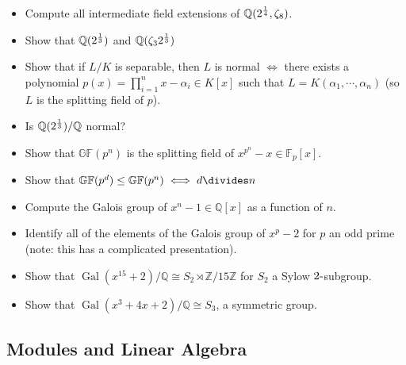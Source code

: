 \begin{itemize}
\tightlist
\item
  Compute all intermediate field extensions of
  \({\mathbb{Q}}(2^{1\over 4}, \zeta_8)\).
\item
  Show that \({\mathbb{Q}}(2^{1\over 3})\) and
  \({\mathbb{Q}}(\zeta_3 2^{1\over 3})\)
\item
  Show that if \(L/K\) is separable, then \(L\) is normal \(\iff\) there
  exists a polynomial \(p(x) = \prod_{i=1}^n x- \alpha_i\in K[x]\) such
  that \(L = K(\alpha_1, \cdots, \alpha_n)\) (so \(L\) is the splitting
  field of \(p\)).
\item
  Is \({\mathbb{Q}}(2^{1\over 3})/{\mathbb{Q}}\) normal?
\item
  Show that \({\mathbb{GF}}(p^n)\) is the splitting field of
  \(x^{p^n} - x \in {\mathbb{F}}_p[x]\).
\item
  Show that
  \({\mathbb{GF}}(p^d) \leq {\mathbb{GF}}(p^n) \iff d\divides n\)
\item
  Compute the Galois group of \(x^n - 1 \in {\mathbb{Q}}[x]\) as a
  function of \(n\).
\item
  Identify all of the elements of the Galois group of \(x^p-2\) for
  \(p\) an odd prime (note: this has a complicated presentation).
\item
  Show that
  \(\operatorname{Gal}(x^{15}+2)/{\mathbb{Q}}\cong S_2 \rtimes{\mathbb{Z}}/15{\mathbb{Z}}\)
  for \(S_2\) a Sylow \(2{\hbox{-}}\)subgroup.
\item
  Show that \(\operatorname{Gal}(x^3+4x+2)/{\mathbb{Q}}\cong S_3\), a
  symmetric group.
\end{itemize}

\hypertarget{modules-and-linear-algebra}{%
\subsection{Modules and Linear
Algebra}\label{modules-and-linear-algebra}}

